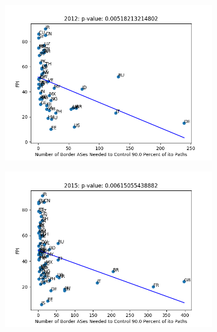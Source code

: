 \documentclass{article}
\begin{document}
\begin{multicols}{2}
\begin{figure}
	\centering
	\begin{subfigure}[b]{0.4\linewidth}
		\includegraphics[width=\linewidth]{fotn2012}
	\end{subfigure}
	\begin{subfigure}[b]{0.4\linewidth}
		\includegraphics[width=\linewidth]{fotn2015}
	\end{subfigure}
	\\
	\begin{subfigure}[b]{0.4\linewidth}

\end{subfigure}
\end{figure}
\end{multicols}
\end{document}
